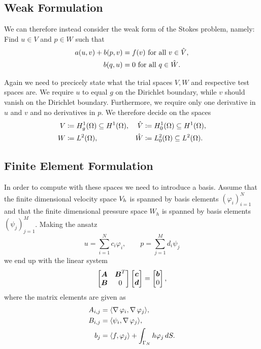 \subsection{Weak Formulation}

We can therefore instead consider the weak form of the Stokes problem, namely:
Find \( u \in V \) and \( p \in W \) such that 
\begin{align}
    a(u, v) + b(p, v) &= f(v) \text{ for all } v \in \hat{V},\\
    b(q, u) &= 0 \text{ for all } q \in \hat{W}.
\end{align}

Again we need to precicely state what the trial spaces \( V, W \) and
respective test spaces are. We require \( u \) to equal \( g \) on the
Dirichlet boundary, while \( v \) should vanish on the Dirichlet boundary.
Furthermore, we require only one derivative in \( u \) and \( v \) and no
derivatives in \( p \). We therefore decide on the spaces
\begin{align}
    V &\coloneqq H^1_g(\Omega) \subseteq H^1 (\Omega), & \hat{V} &\coloneqq
    H^1_0(\Omega) \subseteq H^1(\Omega), \\ 
    W &\coloneqq L^2(\Omega), & \hat{W} &\coloneqq L^2_0(\Omega) \subseteq
    L^2(\Omega).
\end{align}

\subsection{Finite Element Formulation}

In order to compute with these spaces we need to introduce a basis. Assume that
the finite dimensional velocity space \( V_h \) is spanned by basis
elements \((\varphi_i)_{i=1}^N \) and that the finite dimensional pressure
space \( W_h \) is spanned by basis elements \((\psi_j)_{j=1}^M\).  Making the
ansatz
\begin{equation}
    u = \sum^{N}_{i=1} c_i \varphi_i, \qquad p = \sum^{M}_{j=1} d_i \psi_j
\end{equation}
we end up with the linear system 
\begin{equation}
    \label{eq:discretized_stokes}
    \begin{bmatrix}
        \boldsymbol{A} & \boldsymbol{B}^T \\
        \boldsymbol{B} & 0
    \end{bmatrix} \begin{bmatrix}
        \boldsymbol{c} \\
        \boldsymbol{d}
    \end{bmatrix}
    =
    \begin{bmatrix}
        \boldsymbol{b} \\
        0
    \end{bmatrix},
\end{equation}
where the matrix elements are given as
\begin{align}
    A_{i, j} &= \langle \operatorname{\mathop{}\!\nabla} \varphi_i, \operatorname{\mathop{}\!\nabla} \varphi_j \rangle, \\
    B_{i, j} &= \langle \psi_i, \operatorname{\mathop{}\!\nabla} \varphi_j \rangle, \\
    b_j &= \langle f, \varphi_j \rangle + \int_{\Gamma_N} h \varphi_j \, dS.
\end{align}

